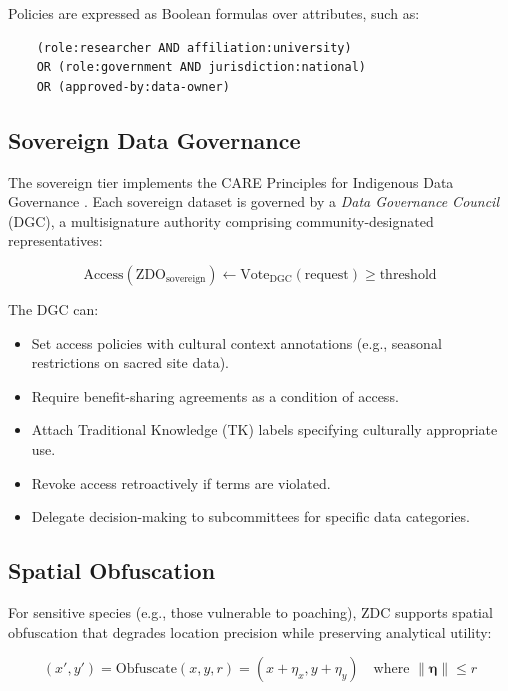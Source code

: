 Policies are expressed as Boolean formulas over attributes, such as:

\begin{verbatim}
    (role:researcher AND affiliation:university)
    OR (role:government AND jurisdiction:national)
    OR (approved-by:data-owner)
\end{verbatim}

\subsection{Sovereign Data Governance}

The sovereign tier implements the CARE Principles for Indigenous Data Governance \citep{carroll2020care}.
Each sovereign dataset is governed by a \emph{Data Governance Council} (DGC), a multisignature authority comprising community-designated representatives:

\begin{equation}
    \text{Access}(\text{ZDO}_{\text{sovereign}}) \leftarrow \text{Vote}_{\text{DGC}}(\text{request}) \geq \text{threshold}
\end{equation}

The DGC can:
\begin{itemize}[leftmargin=*]
    \item Set access policies with cultural context annotations (e.g., seasonal restrictions on sacred site data).
    \item Require benefit-sharing agreements as a condition of access.
    \item Attach Traditional Knowledge (TK) labels specifying culturally appropriate use.
    \item Revoke access retroactively if terms are violated.
    \item Delegate decision-making to subcommittees for specific data categories.
\end{itemize}

\subsection{Spatial Obfuscation}

For sensitive species (e.g., those vulnerable to poaching), ZDC supports spatial obfuscation that degrades location precision while preserving analytical utility:

\begin{equation}
    (x', y') = \text{Obfuscate}(x, y, r) = (x + \eta_x, y + \eta_y) \quad \text{where } \|\boldsymbol{\eta}\| \leq r
\end{equation}

